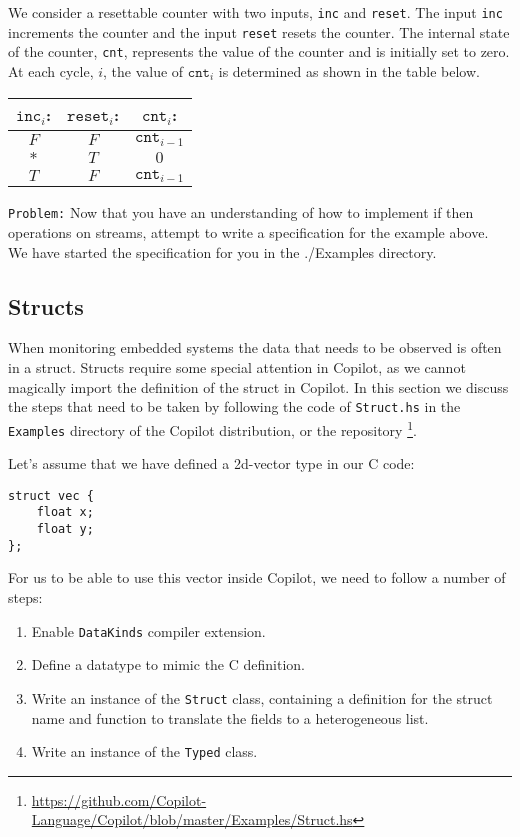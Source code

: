 \begin{example} We consider a resettable counter with two inputs, {\tt inc} and
{\tt reset}.
%
The input {\tt inc} increments the counter and the input {\tt reset} resets the
counter.
%
The internal state of the counter, {\tt cnt}, represents the value of the
counter and is initially set to zero. 
%
At each cycle, $i$, the value of $\mathtt{cnt}_i$ is determined as shown in the
table below.

\begin{center}
\begin{minipage}{0.25\linewidth}
\begin{tabular}{c|c||c}
$\mathtt{inc}_i$: & $\mathtt{reset}_i$: & $\mathtt{cnt}_i$:\\
\hline
$F$ & $F$ & $\mathtt{cnt}_{i-1}$ \\
\hline
$*$ & $T$ & $0$ \\
\hline
$T$ & $F$ & $\mathtt{cnt}_{i-1}$\\
\hline
\end{tabular}
\end{minipage}
\end{center}
\end{example}

{\tt Problem:} Now that you have an understanding of how to implement if then
operations on streams, attempt to write a specification for the example above.
%
We have started the specification for you in the ./Examples directory.




\subsection{Structs}
When monitoring embedded systems the data that needs to be observed is often in a struct.
Structs require some special attention in Copilot, as we cannot magically
import the definition of the struct in Copilot. In this section we discuss the
steps that need to be taken by following the code of \texttt{Struct.hs} in the
\texttt{Examples} directory of the Copilot distribution, or the repository
\footnote{\url{https://github.com/Copilot-Language/Copilot/blob/master/Examples/Struct.hs}}.

Let's assume that we have defined a 2d-vector type in our C code:
\begin{lstlisting}
struct vec {
	float x;
	float y;
};
\end{lstlisting}
For us to be able to use this vector inside Copilot, we need to follow a number
of steps:
\begin{enumerate}
  \item Enable \texttt{DataKinds} compiler extension.
  \item Define a datatype to mimic the C definition.
  \item Write an instance of the \texttt{Struct} class, containing a definition
  for the struct name and function to translate the fields to a heterogeneous
    list.
  \item Write an instance of the \texttt{Typed} class.
\end{enumerate}

